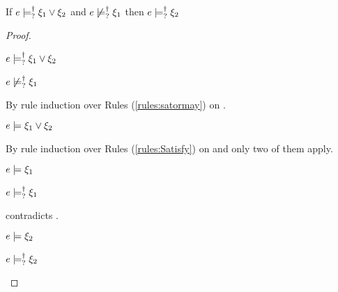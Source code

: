 \begin{lem}
  \label{lem:satisfy-substraction}
  If $e \models_{?}^{\dag} \xi_1 \vee \xi_2$ and $e \not\models_{?}^{\dag} \xi_1$ then $e \models_{?}^{\dag} \xi_2$
\end{lem}
\begin{proof}
  \begin{pfsteps*}
  \item $e \models_{?}^{\dag} \xi_1 \vee \xi_2$  
  \item $e \not\models_{?}^{\dag} \xi_1$  
  \end{pfsteps*}
  By rule induction over Rules (\ref{rules:satormay}) on .
  \begin{byCases}

  \item[\text{(\ref{rule:CSMSSat})}]
    \begin{pfsteps*}
    \item $e \models \xi_1 \vee \xi_2$  
    \end{pfsteps*}
    By rule induction over Rules (\ref{rules:Satisfy}) on  and only two of them apply.
    \begin{byCases}

    \item[\text{(\ref{rule:CSOr1})}]
      \begin{pfsteps*}
      \item $e \models \xi_1$  
      \item $e \models_{?}^{\dag} \xi_1$  
      \end{pfsteps*}
       contradicts .

    \item[\text{(\ref{rule:CSOr2})}]
      \begin{pfsteps*}
      \item $e \models \xi_2$  
      \item $e \models_{?}^{\dag} \xi_2$ 
      \end{pfsteps*}
    \end{byCases}


\end{byCases}
\end{proof}
